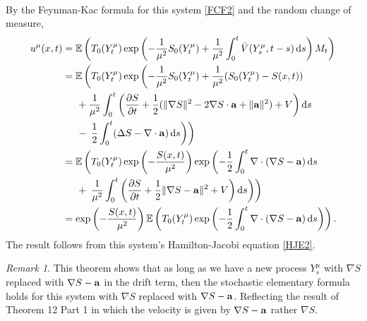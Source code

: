 \documentclass[a4paper,12pt,draft]{report}
\theoremstyle{remark}
\newtheorem{remark}{Remark}
\theoremstyle{definition}
\begin{document}
{\begin{align}
\end{align}
By the Feynman-Kac formula for this system \eqref{FCF2} and the random change of measure,
\begin{align}
u^\mu(x, t) & = \mathbb{E}\left(T_0(Y_t^\mu)\exp\left(-\frac{1}{\mu^2}S_0(Y_t^\mu) + \frac{1}{\mu^2}\int_0^t\bar{V}(Y_s^\mu, t - s)\,\mathrm{d}s\right)M_t\right)\nonumber\\
& = \mathbb{E}\left(T_0(Y_t^\mu)\exp\left(-\frac{1}{\mu^2}S_0(Y_t^\mu) + \frac{1}{\mu^2}(S_0(Y_t^\mu) - S(x, t))\right.\right.\nonumber\\
& \hspace{0.5cm} + \frac{1}{\mu^2}\int_0^t\left(\frac{\partial S}{\partial t} + \frac{1}{2}(\|\nabla S\|^2 - 2\nabla S\cdot\bold{a} + \|\bold{a}\|^2) + V\right)\mathrm{d}s\nonumber\\
& \hspace{0.5cm} - \left.\left.\frac{1}{2}\int_0^t(\Delta S - \nabla\cdot\bold{a})\,\mathrm{d}s\right)\right)\nonumber\\
& = \mathbb{E}\left(T_0(Y_t^\mu)\exp\left(-\frac{S(x, t)}{\mu^2}\right)\exp\left(-\frac{1}{2}\int_0^t\nabla\cdot(\nabla S - \bold{a})\,\mathrm{d}s\right.\right.\nonumber\\
& \hspace{0.5cm} + \left.\left.\frac{1}{\mu^2}\int_0^t\left(\frac{\partial S}{\partial t} + \frac{1}{2}\|\nabla S - \bold{a}\|^2 + V\right)\mathrm{d}s\right)\right)\nonumber\\
& = \exp\left(-\frac{S(x, t)}{\mu^2}\right)\mathbb{E}\left(T_0(Y_t^\mu)\exp\left(-\frac{1}{2}\int_0^t\nabla\cdot(\nabla S - \bold{a})\,\mathrm{d}s\right)\right).\nonumber
\end{align}
The result follows from this system's Hamilton-Jacobi equation \eqref{HJE2}.

\qedhere
}

\begin{remark}
{
This theorem shows that as long as we have a new process $Y_s^\mu$ with $\nabla S$ replaced with $\nabla S - \bold{a}$ in the drift term, then the stochastic elementary formula holds for this system with $\nabla S$ replaced with $\nabla S - \bold{a}$.  Reflecting the result of Theorem 12 Part 1 in which the velocity is given by $\nabla S - \bold{a}$ rather $\nabla S$.
}
\end{remark}
\end{document}

